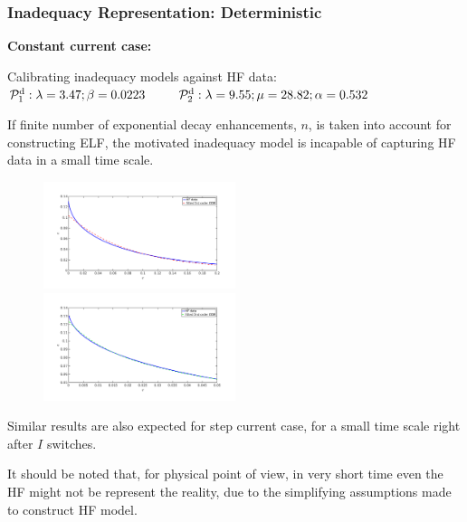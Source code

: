 \documentclass[10pt,xcolor=dvipsnames,compress]{beamer}
\begin{document}
\begin{frame}
\frametitle{Inadequacy Representation: Deterministic}
\vfill


\textbf{Constant current case:}


Calibrating inadequacy models against HF data: \\
$\mathcal{P}_1^{\rm d}:   \lambda = 3.47; \beta = 0.0223 \qquad$
$\mathcal{P}_2^{\rm d}:   \lambda = 9.55; \mu = 28.82; \alpha = 0.532$


If finite number of exponential decay enhancements, $n$, is taken into account for constructing ELF, the motivated inadequacy model is incapable of capturing HF data in a small time scale.
\vspace{-0.2in}
\begin{figure}
\includegraphics[trim = 1.in 1.in 1.in 1.3in, clip, width=0.5\textwidth]{figs/Iconst_eps_modelfit_1st_zoom.png}
~
\includegraphics[trim = 1.in 1.in 1.in 1.3in, clip, width=0.5\textwidth]{figs/Iconst_eps_modelfit_2nd_zoom.png}
\end{figure}
\vspace{-0.1in}
Similar results are also expected for step current case, for a small time scale right after $I$ switches.

It should be noted that, for physical point of view, in very short time even the HF might not be represent the reality, due to the simplifying assumptions made to construct HF model.


\vfill
\end{frame}
\end{document}
